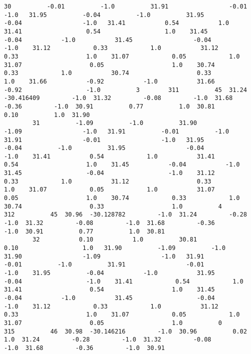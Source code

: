\documentclass[11pt]{article}
\begin{document}
\begin{Verbatim}[commandchars=\\\{\}]
        30          -0.01          -1.0          31.91                 -0.01                 -1.0   31.95          -0.04          -1.0          31.95                 -0.04                 -1.0   31.41           0.54           1.0          31.41                  0.54                  1.0    31.45          -0.04           -1.0           31.45                 -0.04                  -1.0    31.12            0.33            1.0           31.12                   0.33                   1.0    31.07            0.05            1.0           31.07                   0.05                   1.0    30.74            0.33            1.0           30.74                   0.33                   1.0    31.66           -0.92           -1.0           31.66                  -0.92                  -1.0          3        311          45  31.24  -30.416409         -1.0  31.32         -0.08         -1.0  31.68         -0.36         -1.0  30.91          0.77          1.0  30.81          0.10          1.0  31.90   
        31          -1.09          -1.0          31.90                 -1.09                 -1.0   31.91          -0.01          -1.0          31.91                 -0.01                 -1.0   31.95          -0.04          -1.0          31.95                 -0.04                 -1.0    31.41           0.54            1.0           31.41                  0.54                   1.0    31.45           -0.04           -1.0           31.45                  -0.04                  -1.0    31.12            0.33            1.0           31.12                   0.33                   1.0    31.07            0.05            1.0           31.07                   0.05                   1.0    30.74            0.33            1.0           30.74                   0.33                   1.0          4        312          45  30.96  -30.128782         -1.0  31.24         -0.28         -1.0  31.32         -0.08         -1.0  31.68         -0.36         -1.0  30.91          0.77          1.0  30.81   
        32           0.10           1.0          30.81                  0.10                  1.0   31.90          -1.09          -1.0          31.90                 -1.09                 -1.0   31.91          -0.01          -1.0          31.91                 -0.01                 -1.0    31.95          -0.04           -1.0           31.95                 -0.04                  -1.0    31.41            0.54            1.0           31.41                   0.54                   1.0    31.45           -0.04           -1.0           31.45                  -0.04                  -1.0    31.12            0.33            1.0           31.12                   0.33                   1.0    31.07            0.05            1.0           31.07                   0.05                   1.0          0        315          46  30.98  -30.146216         -1.0  30.96          0.02          1.0  31.24         -0.28         -1.0  31.32         -0.08         -1.0  31.68         -0.36         -1.0  30.91   

\end{Verbatim}
\end{document}
